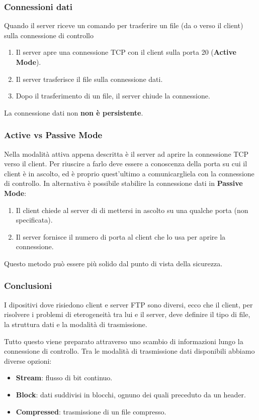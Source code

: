 \subsubsection{Connessioni dati}
Quando il server riceve un comando per trasferire un file (da o verso 
il client) sulla connessione di controllo
\begin{enumerate}
	\item Il server apre una connessione TCP con il client sulla 
		porta 20 (\textbf{Active Mode}).
	\item Il server trasferisce il file sulla connessione dati.
	\item Dopo il trasferimento di un file, il server chiude la 
		connessione.
\end{enumerate}
La connessione dati non \textbf{non è persistente}.

\subsubsection{Active vs Passive Mode}
Nella modalità attiva appena descritta è il server ad aprire la 
connessione TCP verso il client. Per riuscire a farlo deve essere a 
conoscenza della porta su cui il client è in ascolto, ed è proprio 
quest'ultimo a comunicargliela con la connessione di controllo. In
alternativa è possibile stabilire la connessione dati in 
\textbf{Passive Mode}:
\begin{enumerate}
	\item Il client chiede al server di di mettersi in ascolto su una
		qualche porta (non specificata).
	\item Il server fornisce il numero di porta al client che lo usa 
		per aprire la connessione.
\end{enumerate}
Questo metodo può essere più solido dal punto di vista della sicurezza.

\subsubsection{Conclusioni}
I dipositivi dove risiedono client e server FTP sono diversi, ecco che 
il client, per risolvere i problemi di eterogeneità tra lui e il
server, deve definire il tipo di file, la struttura dati e la modalità 
di trasmissione.

Tutto questo viene preparato attraverso uno scambio di informazioni 
lungo la connessione di controllo. Tra le modalità di trasmissione dati
disponibili abbiamo diverse opzioni:
\begin{itemize}
	\item \textbf{Stream}: flusso di bit continuo.
	\item \textbf{Block}: dati suddivisi in blocchi, ognuno dei quali 
		preceduto da un header.
	\item \textbf{Compressed}: trasmissione di un file compresso.
\end{itemize}

